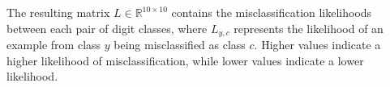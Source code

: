 The resulting matrix $L \in \mathbb{R}^{10 \times 10}$ contains the misclassification likelihoods between each pair of digit classes, where $L_{y,c}$ represents the likelihood of an example from class $y$ being misclassified as class $c$. Higher values indicate a higher likelihood of misclassification, while lower values indicate a lower likelihood.












